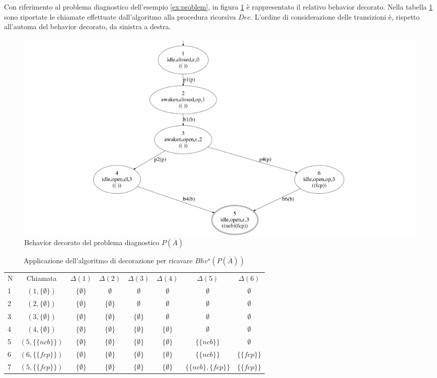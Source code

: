 \begin{ex}
Con riferimento al problema diagnostico dell'esempio \ref{ex:problem}, in figura \ref{fig:bhv_star} è rappresentato il relativo behavior decorato.
Nella tabella \ref{tab:decoration} sono riportate le chiamate effettuate dall'algoritmo alla procedura ricorsiva $Dec$. L'ordine di considerazione delle transizioni è, rispetto all'automa del behavior decorato, da sinistra a destra.
\end{ex}

\begin{figure}[htbp]
\centering
\includegraphics[scale=0.13]{./Img/sa/bhv_star.png}
\caption{Behavior decorato del problema diagnostico $P(\overline{A})$}
\label{fig:bhv_star}
\end{figure}

\begin{table}[htbp] 
\begin{tabularx}{\textwidth}{l c c c c c c c}
\hline
N & Chiamata & $\Delta(1)$ & $\Delta(2)$ & $\Delta(3)$ & $\Delta(4)$ & $\Delta(5)$ & $\Delta(6)$\\
1 & $(1,\{\emptyset\})$ & $\{\emptyset\}$  & $\emptyset$ & $\emptyset$ & $\emptyset$ & $\emptyset$ & $\emptyset$\\
2 & $(2,\{\emptyset\})$ & $\{\emptyset\}$  & $\{\emptyset\}$ & $\emptyset$ & $\emptyset$ & $\emptyset$ & $\emptyset$\\
3 & $(3,\{\emptyset\})$ & $\{\emptyset\}$  & $\{\emptyset\}$ & $\{\emptyset\}$ & $\emptyset$ & $\emptyset$ & $\emptyset$\\
4 & $(4,\{\emptyset\})$ & $\{\emptyset\}$  & $\{\emptyset\}$ & $\{\emptyset\}$ & $\{\emptyset\}$ & $\emptyset$ & $\emptyset$\\
5 & $(5,\{\{ncb\}\})$ & $\{\emptyset\}$  & $\{\emptyset\}$ & $\{\emptyset\}$ & $\{\emptyset\}$ & $\{\{ncb\}\}$ & $\emptyset$\\
6 & $(6,\{\{fcp\}\})$ & $\{\emptyset\}$  & $\{\emptyset\}$ & $\{\emptyset\}$ & $\{\emptyset\}$ & $\{\{ncb\}\}$ & $\{\{fcp\}\}$\\
7 & $(5,\{\{fcp\}\})$ & $\{\emptyset\}$  & $\{\emptyset\}$ & $\{\emptyset\}$ & $\{\emptyset\}$ & $\{\{ncb\},\{fcp\}\}$ & $\{\{fcp\}\}$\\
\hline
\end{tabularx}
\caption{Applicazione dell'algoritmo di decorazione per ricavare $Bhv^\star(P(\overline{A}))$}
\label{tab:decoration}
\end{table}


